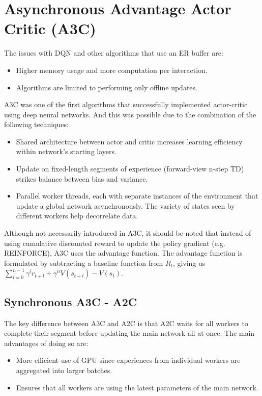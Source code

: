 \documentclass[11pt]{article} %
\begin{document}
\section{Asynchronous Advantage Actor Critic (A3C)}
The issues with DQN and other algorithms that use an ER buffer are:
\begin{itemize}
    \item Higher memory usage and more computation per interaction.
    \item Algorithms are limited to performing only offline updates.
\end{itemize}
A3C \cite{a3c} was one of the first algorithms that successfully implemented actor-critic using deep neural networks. And this was possible due to the combination of the following techniques:
\begin{itemize}
    \item Shared architecture between actor and critic increases learning efficiency within network's starting layers.
    \item Update on fixed-length segments of experience (forward-view n-step TD) strikes balance between bias and variance.
    \item Parallel worker threads, each with separate instances of the environment that update a global network asynchronously. The variety of states seen by different workers help decorrelate data.
\end{itemize}
Although not necessarily introduced in A3C, it should be noted that instead of using cumulative discounted reward to update the policy gradient (e.g. REINFORCE), A3C uses the advantage function. The advantage function is formulated by subtracting a baseline function from $R_t$, giving us $\sum_{l=0}^{n-1} \gamma^l r_{t+l}+\gamma^nV(s_{t+l})-V(s_t)$.
\subsection{Synchronous A3C - A2C}
The key difference between A3C and A2C \cite{a2c} is that A2C waits for all workers to complete their segment before updating the main network all at once. The main advantages of doing so are:
\begin{itemize}
    \item More efficient use of GPU since experiences from individual workers are aggregated into larger batches.
    \item Ensures that all workers are using the latest parameters of the main network.
\end{itemize}
\end{document}
